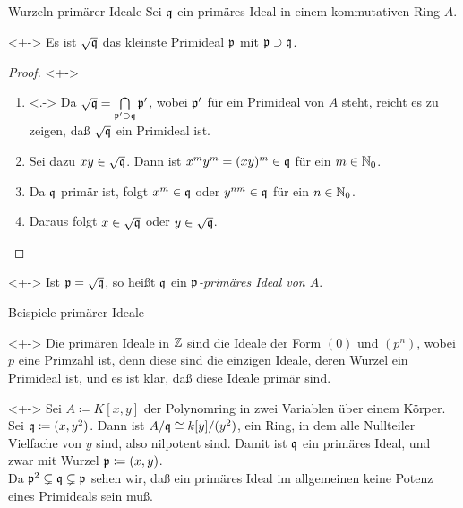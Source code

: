 \begin{frame}{Wurzeln primärer Ideale}
	Sei \(\mathfrak{q}\) ein primäres Ideal in einem kommutativen Ring \(A\). 
	\begin{proposition}<+->
		Es ist \(\sqrt{\mathfrak{q}}\) das kleinste Primideal \(\mathfrak{p}\) mit \(\mathfrak{p} \supset \mathfrak{q}\).
	\end{proposition}
	\begin{proof}<+->
		\begin{enumerate}[<+->]
		\item<.->
			Da \(\sqrt{\mathfrak{q}} = \bigcap\limits_{\mathfrak{p}' \supset \mathfrak{q}} \mathfrak{p}'\), wobei \(\mathfrak{p}'\) für ein
			Primideal von \(A\) steht, reicht es zu zeigen, daß \(\sqrt{\mathfrak{q}}\) ein Primideal ist.
		\item
			Sei dazu \(x y \in \sqrt{\mathfrak{q}}\). Dann ist \(x^m y^m = (x y)^m \in \mathfrak{q}\) für ein \(m \in \mathbb N_0\).
		\item
			Da \(\mathfrak{q}\) primär ist, folgt \(x^m \in \mathfrak{q}\) oder \(y^{nm} \in \mathfrak{q}\) für ein \(n \in \mathbb N_0\).
		\item
			Daraus folgt \(x \in \sqrt{\mathfrak{q}}\) oder \(y \in \sqrt{\mathfrak{q}}\).
			\qedhere
		\end{enumerate}
	\end{proof}
	\begin{definition}<+->
		Ist \(\mathfrak{p} = \sqrt{\mathfrak{q}}\), so heißt \(\mathfrak{q}\) ein \emph{\(\mathfrak{p}\)-primäres Ideal von \(A\)}.
	\end{definition}
\end{frame}

\begin{frame}{Beispiele primärer Ideale}
	\begin{example}<+->
		Die primären Ideale in \(\mathbb Z\) sind die Ideale der Form \((0)\) und \((p^n)\), wobei \(p\) eine Primzahl ist, denn
		diese sind die einzigen Ideale, deren Wurzel ein Primideal ist, und es ist klar, daß diese Ideale primär sind.
	\end{example}
	\begin{example}<+->
		Sei \(A \coloneqq K[x, y]\) der Polynomring in zwei Variablen über einem Körper. Sei \(\mathfrak{q} \coloneqq (x, y^2)\). Dann ist
		\(A/\mathfrak{q} \cong k[y]/(y^2)\), ein Ring, in dem alle Nullteiler Vielfache von \(y\) sind, also nilpotent sind. Damit ist
		\(\mathfrak{q}\) ein primäres Ideal, und zwar mit Wurzel \(\mathfrak{p} \coloneqq (x, y)\).
		\\
		Da \(\mathfrak{p}^2 \subsetneq \mathfrak{q} \subsetneq \mathfrak{p}\) sehen wir, daß ein primäres Ideal im allgemeinen keine Potenz
		eines Primideals sein muß.
	\end{example}
\end{frame}

